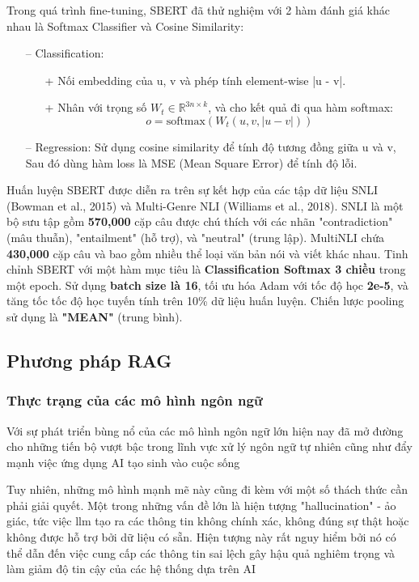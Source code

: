 \documentclass[a4paper, 12pt, openany]{book}
\begin{document}
Trong quá trình fine-tuning, SBERT đã thử nghiệm với 2 hàm đánh giá khác nhau là Softmax Classifier và Cosine Similarity:

\begin{itemize}
    \item[--] Classification: \begin{itemize}
            \item[+] Nối embedding của u, v và phép tính element-wise |u - v|.
            \item[+] Nhân với trọng số  \(W_t \in \mathbb{R}^{3n \times k}\), và cho kết quả đi qua hàm softmax:
                \begin{equation}
                    o = \text{softmax}(W_t(u, v, |u - v|))
                \end{equation}
        \end{itemize}
    \item[--] Regression: Sử dụng cosine similarity để tính độ tương đồng giữa u và v, Sau đó dùng hàm loss là MSE (Mean Square Error) để tính độ lỗi.
\end{itemize}

Huấn luyện SBERT được diễn ra trên sự kết hợp của các tập dữ liệu SNLI \cite{snli:emnlp2015} (Bowman et al., 2015) và Multi-Genre NLI \cite{N18-1101} (Williams et al., 2018).
SNLI là một bộ sưu tập gồm \textbf{570,000} cặp câu được chú thích với các nhãn "contradiction" (mâu thuẫn), "entailment" (hỗ trợ), và "neutral" (trung lập).
MultiNLI chứa \textbf{430,000} cặp câu và bao gồm nhiều thể loại văn bản nói và viết khác nhau. Tinh chỉnh SBERT với một hàm mục tiêu là \textbf{Classification Softmax 3 chiều} trong một epoch. Sử dụng \textbf{batch size là 16}, tối ưu hóa Adam với tốc độ học \textbf{2e-5},
và tăng tốc tốc độ học tuyến tính trên 10\% dữ liệu huấn luyện. Chiến lược pooling sử dụng là \textbf{"MEAN"} (trung bình).


\subsection{Phương pháp RAG}
\subsubsection{Thực trạng của các mô hình ngôn ngữ}
Với sự phát triển bùng nổ của các mô hình ngôn ngữ lớn hiện nay đã mở đường cho những tiến bộ vượt bậc trong lĩnh vực xử lý ngôn ngữ tự nhiên cũng như đẩy mạnh việc ứng dụng AI tạo sinh vào cuộc sống

Tuy nhiên, những mô hình mạnh mẽ này cũng đi kèm với một số thách thức cần phải giải quyết.
Một trong những vấn đề lớn là hiện tượng "hallucination" - ảo giác, tức việc \ac{llm} tạo ra các thông tin không chính xác,
không đúng sự thật hoặc không được hỗ trợ bởi dữ liệu có sẵn. Hiện tượng này rất nguy hiểm bởi nó có thể dẫn đến việc cung cấp các thông tin sai lệch gây hậu quả nghiêm trọng và làm giảm độ tin cậy của các hệ thống dựa trên AI
\end{document}
